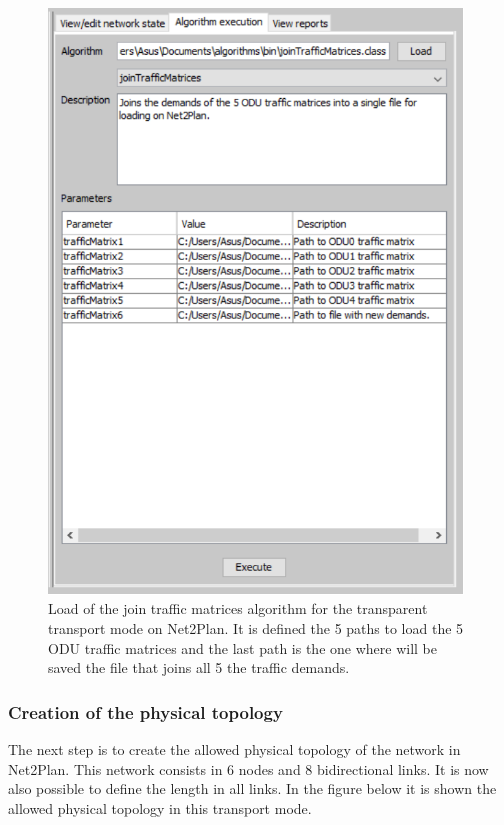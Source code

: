 \begin{figure}[H]
\centering
\includegraphics[width=11cm]{sdf/heuristic/transparent_survivability/figures/traffic_matrices}
\caption{Load of the join traffic matrices algorithm for the transparent transport mode on Net2Plan. It is defined the 5 paths to load the 5 ODU traffic matrices and the last path is the one where will be saved the file that joins all 5 the traffic demands.}
\label{traffic_matrices_transp_surv_ref}
\end{figure}

\newpage
\subsubsection{Creation of the physical topology}

\vspace{11pt}
The next step is to create the allowed physical topology of the network in Net2Plan. This network consists in 6 nodes and 8 bidirectional links. It is now also possible to define the length in all links. In the figure below it is shown the allowed physical topology in this transport mode.

